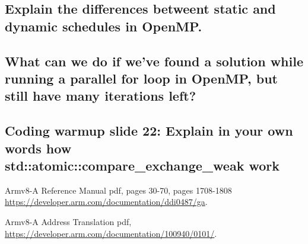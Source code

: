 \documentclass[runningheads]{llncs}
\begin{document}
\subsection{Explain the differences betweent static and dynamic schedules in OpenMP.}

\subsection{What can we do if we've found a solution while running a parallel for loop in OpenMP, but still have many iterations left?}

\subsection{Coding warmup slide 22: Explain in your own words how std::atomic::compare\_exchange\_weak work}




%
%
%
% 
% 
%
\begin{thebibliography}{8}


Armv8-A Reference Manual pdf, pages 30-70, pages 1708-1808 \\ \url{https://developer.arm.com/documentation/ddi0487/ga}.


Armv8-A Address Translation pdf, \url{https://developer.arm.com/documentation/100940/0101/}.

\end{thebibliography}
\end{document}

